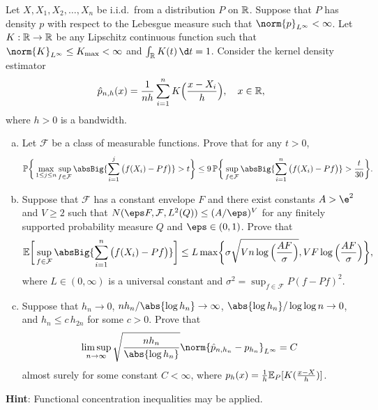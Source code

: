 \documentclass[12pt, a3paper, openany]{book}
\begin{document}
\begin{Prob}
Let $X,X_{1},X_{2},\dots,X_{n}$ be i.i.d.\ from a distribution $P$ on $\mathbb{R}$. Suppose that $P$ has density $p$ with respect to the Lebesgue measure such that $\norm{p}_{L^\infty} < \infty$. Let $K : \mathbb{R} \to \mathbb{R}$ be any Lipschitz continuous function such that $\norm{K}_{L^\infty} \leq K_{\max} < \infty$ and $\int_{\R} K(t) \,\d t = 1$. Consider the kernel density estimator \vspace{-1ex}
\[ \hat{p}_{n,h}(x) = \frac{1}{nh} \sum_{i=1}^{n} K\Big(\frac{x-X_{i}}{h}\Big) , \quad x \in \R , \vspace{-2ex}\]
where $h > 0$ is a bandwidth. 
\begin{enumerate}[(a)]
	\setlength{\itemsep}{0pt}
\item Let $\mathcal{F}$ be a class of measurable functions. Prove that for any $t>0$, \vspace{-2ex}
\[ \P\bigg\{ \max_{1 \leq j \leq n} \sup_{f\in\mathcal{F}} \absBig{\sum_{i=1}^{j}\big(f(X_{i})-Pf\big)} > t \bigg\} \leq 9 \, \P\bigg\{ \sup_{f\in\mathcal{F}} \absBig{\sum_{i=1}^{n}\big(f(X_{i})-Pf\big)} > \frac{t}{30} \bigg\} . \vspace{-2ex}\]
\item Suppose that $\mathcal{F}$ has a constant  envelope $F$ and there exist constants $A > \e^{2}$ and $V \geq 2$ such that $N(\eps F, \mathcal{F}, L^{2}(Q)) \leq (A/\eps)^{V}$ for any finitely supported probability measure $Q$ and $\eps \in (0,1)$. Prove that \vspace{-1ex}
\[ \E\bigg[ \sup_{f\in\mathcal{F}} \absBig{\sum_{i=1}^{n}\big(f(X_{i})-Pf\big)} \bigg] \leq L \max\biggl\{ \sigma\sqrt{Vn\log\Big(\frac{AF}{\sigma}\Big)} , VF\log\Big(\frac{AF}{\sigma}\Big) \biggr\} , \vspace{-1ex}\]
where $L \in (0,\infty)$ is a universal constant and $\sigma^{2} = \sup_{f\in\mathcal{F}} P(f-Pf)^{2}$. 
\item Suppose that $h_{n} \to 0$, $nh_{n}/\abs{\log h_{n}} \to \infty$, $\abs{\log h_{n}} / \log\log n \to 0$, and $h_{n} \leq c \, h_{2n}$ for some $c > 0$. Prove that \vspace{-1ex}
\[ \limsup_{n\to\infty} \sqrt{\frac{nh_{n}}{\abs{\log h_{n}}}} \norm{\hat{p}_{n,h_{n}}-p_{h_{n}}}_{L^\infty} = C \]
almost surely for some constant $C < \infty$, where $p_{h}(x) = \frac{1}{h}\mathbb{E}_{P}[K(\frac{x-X}{h})]$. 
\end{enumerate}
\normalfont \textbf{Hint}: Functional concentration inequalities may be applied.
\end{Prob}
\end{document}
